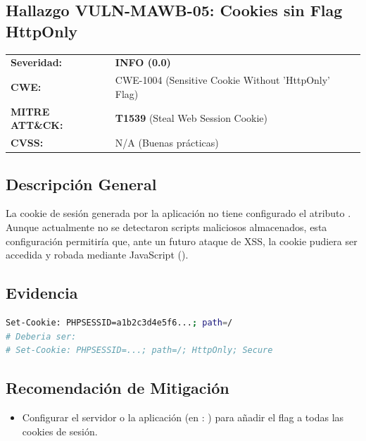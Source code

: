 \documentclass[a4paper]{article}
\newcommand{\maquinaID}{MAWB} %
\begin{document}
\clearpage

\subsection{Hallazgo VULN-\maquinaID-05: Cookies sin Flag HttpOnly}

\begin{tcolorbox}[colback=white, colframe=riskInfo, title=\textbf{Hallazgo VULN-\maquinaID-05: Cookies sin Flag HttpOnly}]
    \begin{tabularx}{\textwidth}{lX}

        \textbf{Severidad:} & 
        \textcolor{riskInfo}{\textbf{INFO (0.0)}} \\

        \textbf{CWE:} & 
        CWE-1004 (Sensitive Cookie Without 'HttpOnly' Flag) \\

        \textbf{MITRE ATT\&CK:} &
        \textbf{T1539} (Steal Web Session Cookie) \\

        \textbf{CVSS:} & 
        N/A (Buenas prácticas) \\

    \end{tabularx}
\end{tcolorbox}

\subsection*{Descripción General}
La cookie de sesión  generada por la aplicación no tiene configurado el atributo . Aunque actualmente no se detectaron scripts maliciosos almacenados, esta configuración permitiría que, ante un futuro ataque de XSS, la cookie pudiera ser accedida y robada mediante JavaScript ().

\subsection*{Evidencia}
\begin{lstlisting}[language=bash, caption=Cabecera Set-Cookie insegura]
Set-Cookie: PHPSESSID=a1b2c3d4e5f6...; path=/
# Deberia ser:
# Set-Cookie: PHPSESSID=...; path=/; HttpOnly; Secure
\end{lstlisting}

\subsection*{Recomendación de Mitigación}
\begin{itemize}
    \item Configurar el servidor o la aplicación (en : ) para añadir el flag  a todas las cookies de sesión.
\end{itemize}
\end{document}
